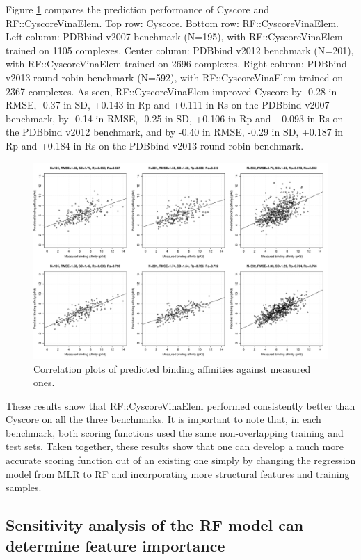 Figure \ref{rfcyscore:cor} compares the prediction performance of Cyscore and RF::CyscoreVinaElem. Top row: Cyscore. Bottom row: RF::CyscoreVinaElem. Left column: PDBbind v2007 benchmark (N=195), with RF::CyscoreVinaElem trained on 1105 complexes. Center column: PDBbind v2012 benchmark (N=201), with RF::CyscoreVinaElem trained on 2696 complexes. Right column: PDBbind v2013 round-robin benchmark (N=592), with RF::CyscoreVinaElem trained on 2367 complexes. As seen, RF::CyscoreVinaElem improved Cyscore by -0.28 in RMSE, -0.37 in SD, +0.143 in Rp and +0.111 in Rs on the PDBbind v2007 benchmark, by -0.14 in RMSE, -0.25 in SD, +0.106 in Rp and +0.093 in Rs on the PDBbind v2012 benchmark, and by -0.40 in RMSE, -0.29 in SD, +0.187 in Rp and +0.184 in Rs on the PDBbind v2013 round-robin benchmark.

\begin{figure}
\includegraphics[width=\linewidth]{../rfcyscore/cor.pdf}
\caption{Correlation plots of predicted binding affinities against measured ones.}
\label{rfcyscore:cor}
\end{figure}

These results show that RF::CyscoreVinaElem performed consistently better than Cyscore on all the three benchmarks. It is important to note that, in each benchmark, both scoring functions used the same non-overlapping training and test sets. Taken together, these results show that one can develop a much more accurate scoring function out of an existing one simply by changing the regression model from MLR to RF and incorporating more structural features and training samples.

\subsection{Sensitivity analysis of the RF model can determine feature importance}

